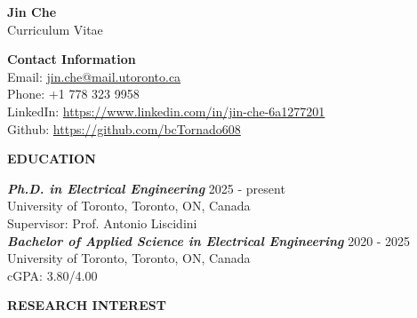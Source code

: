 \documentclass[11pt]{article}
\begin{document}

\begin{center}
	{\Large \bfseries Jin Che} \\ 
	{\large Curriculum Vitae} \\
\end{center}


{\noindent \bf Contact Information} \\ 
Email: \href{mailto:jin.che@mail.utoronto.ca}{jin.che@mail.utoronto.ca} \\ 
Phone: +1 778 323 9958 \\ 
LinkedIn: \href{https://www.linkedin.com/in/jin-che-6a1277201/}{https://www.linkedin.com/in/jin-che-6a1277201} \\ 
Github: \href{https://github.com/bcTornado608}{https://github.com/bcTornado608} \\

\vspace{0.15in}


{\noindent \bfseries EDUCATION}
\vspace{0.05in}
\hline

\vspace{0.1in}

\noindent
{\sl \bfseries Ph.D. in Electrical Engineering} \hfill 2025 - present \\
\noindent University of Toronto, Toronto, ON, Canada \\
\noindent Supervisor: Prof. Antonio Liscidini \\

\noindent
{\sl \bfseries Bachelor of Applied Science in Electrical Engineering} \hfill 2020 - 2025 \\
\noindent University of Toronto, Toronto, ON, Canada \\
\noindent cGPA: 3.80/4.00 \\

\vspace{0.15in}


{\noindent \bfseries RESEARCH INTEREST}
\vspace{0.05in}
\hline
\end{document}
